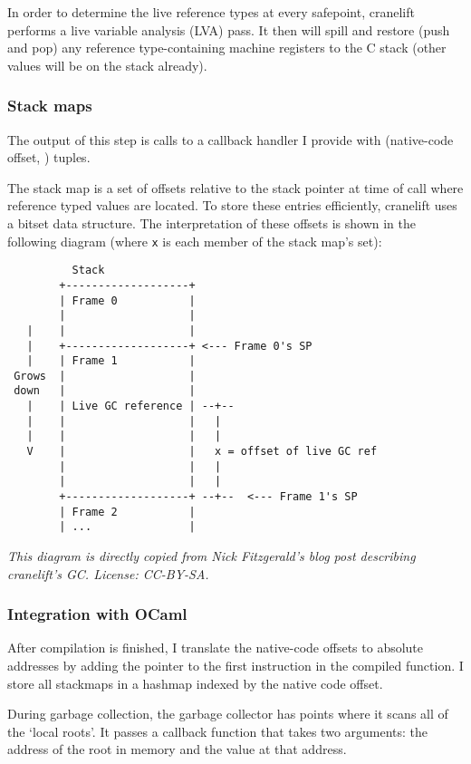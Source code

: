 In order to determine the live reference types at every safepoint, cranelift performs a live
variable analysis (LVA) pass. It then will spill and restore (push and pop) any reference
type-containing machine registers to the C stack (other values will be on the stack already).

\subsubsection{Stack maps}

The output of this step is calls to a callback handler I provide with (native-code offset,
) tuples.

The stack map is a set of offsets relative to the stack pointer at time of call where reference
typed values are located. To store these entries efficiently, cranelift uses a bitset data
structure. The interpretation of these offsets is shown in the following diagram (where \texttt{x}
is each member of the stack map's set):

\begin{verbatim}
          Stack
        +-------------------+
        | Frame 0           |
        |                   |
   |    |                   |
   |    +-------------------+ <--- Frame 0's SP
   |    | Frame 1           |
 Grows  |                   |
 down   |                   |
   |    | Live GC reference | --+--
   |    |                   |   |
   |    |                   |   |
   V    |                   |   x = offset of live GC ref
        |                   |   |
        |                   |   |
        +-------------------+ --+--  <--- Frame 1's SP
        | Frame 2           |
        | ...               |
\end{verbatim}

\noindent\emph{
      This diagram is directly copied from Nick Fitzgerald's blog post \cite{refblog} describing
      cranelift's GC. License: CC-BY-SA.
}

\subsubsection{Integration with OCaml}

After compilation is finished, I translate the native-code offsets to absolute addresses by adding
the
pointer to the first instruction in the compiled function. I store all stackmaps in a hashmap
indexed by the native code offset.

During garbage collection, the garbage collector has points where it scans all of the `local
roots'. It passes a callback function that takes two arguments: the address of the root in
memory
and the value at that address.

